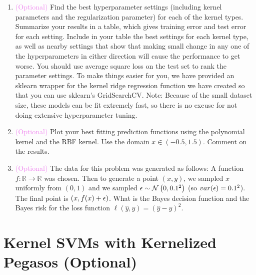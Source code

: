\documentclass{article}
\theoremstyle{plain}
\theoremstyle{definition}
\begin{document}
\begin{enumerate}
\item \textcolor{violet}{(Optional)} Find the best hyperparameter settings (including kernel parameters
and the regularization parameter) for each of the kernel types. Summarize
your results in a table, which gives training error and test error
for each setting. Include in your table the best settings for each
kernel type, as well as nearby settings that show that making small
change in any one of the hyperparameters in either direction will
cause the performance to get worse. You should use average square
loss on the test set to rank the parameter settings. To make things
easier for you, we have provided an sklearn wrapper for the kernel
ridge regression function we have created so that you can use sklearn's
GridSearchCV. Note: Because of the small dataset size, these models
can be fit extremely fast, so there is no excuse for not doing extensive
hyperparameter tuning. 
\item \textcolor{violet}{(Optional)} Plot your best fitting prediction functions using the polynomial kernel
and the RBF kernel. Use the domain $x\in\left(-0.5,1.5\right)$. Comment
on the results. 
\item \textcolor{violet}{(Optional)} The data for this problem was generated as follows: A function $f:\mathbb{R}\to\mathbb{R}$
was chosen. Then to generate a point $\left(x,y\right)$, we sampled
$x$ uniformly from $(0,1)$ and we sampled ${\epsilon}\sim\mathcal{N}\left(0,0.1^{2}\right)$
(so $var({\epsilon})=0.1^{2}$). The final point is $\left(x,f(x)+{\epsilon}\right)$.
What is the Bayes decision function and the Bayes risk for the loss
function $\ell\left(\hat{y},y\right)=\left(\hat{y}-y\right)^{2}$.\\

\setcounter{saveenum}{\value{enumi}}
\end{enumerate}


\section{Kernel SVMs with Kernelized
Pegasos (Optional)}
\end{document}

